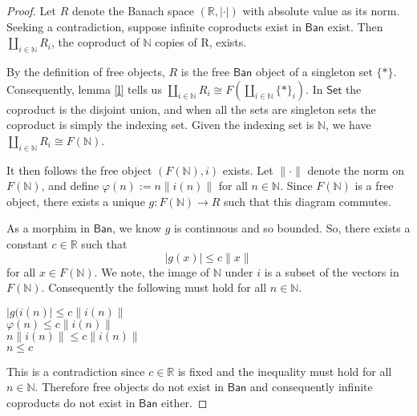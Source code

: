 \documentclass{article}
\newcommand{\R}{\mathbb{R}}
\newcommand{\N}{\mathbb{N}}
\begin{document}
\begin{proof}
	Let $R$ denote the Banach space $(\R,|\cdot|)$ with absolute value as its norm.
	Seeking a contradiction, suppose infinite coproducts exist in $\textsf{Ban}$ exist.
	Then $\coprod_{i\in \N} R_i$, the coproduct of $\N$ copies of R, exists.
	
	\vspace{3mm}
	
	By the definition of free objects, $R$ is the free $\textsf{Ban}$ object of a singleton set $\{\ast\}$.
	Consequently, lemma \ref{l} tells us $\coprod_{i\in \N} R_i \cong F(\coprod_{i\in \N} \{\ast\}_i)$.
	In $\textsf{Set}$ the coproduct is the disjoint union, and when all the sets are singleton sets the coproduct is simply the indexing set.
	Given the indexing set is $\N$, we have $\coprod_{i\in \N} R_i \cong F(\N)$.
	
	\vspace{3mm}
	
	It then follows the free object $(F(\N),i)$ exists.
	Let $\|\cdot\|$ denote the norm on $F(\N)$, and define $\varphi(n):=n\|i(n)\|$ for all $n\in\N$.
	Since $F(\N)$ is a free object, there exists a unique $g:F(\N)\xrightarrow{} R$ such that this diagram commutes.
	
	\begin{center}
	\end{center}
	
	As a morphim in $\textsf{Ban}$, we know $g$ is continuous and so bounded.
	So, there exists a constant $c\in \R$ such that $$|g(x)|\le c\|x\|$$ for all $x\in F(\N)$.
	We note, the image of $\N$ under $i$ is a subset of the vectors in $F(\N)$.
	Consequently the following must hold for all $n\in \N$.
	\begin{center}
		$|g(i(n)|\le c\|i(n)\|$\\
		\vspace{1mm}
		$\varphi(n) \le c\|i(n)\|$\\
		\vspace{1mm}
		$n\|i(n)\|\le c\|i(n)\|$\\
		\vspace{1mm}
		$n\le c$\\
	\end{center}
	This is a contradiction since $c\in \R$ is fixed and  the inequality must hold for all $n\in \N$.
	Therefore free objects do not exist in $\textsf{Ban}$ and consequently infinite coproducts do not exist in $\textsf{Ban}$ either.
\end{proof}
\end{document}
